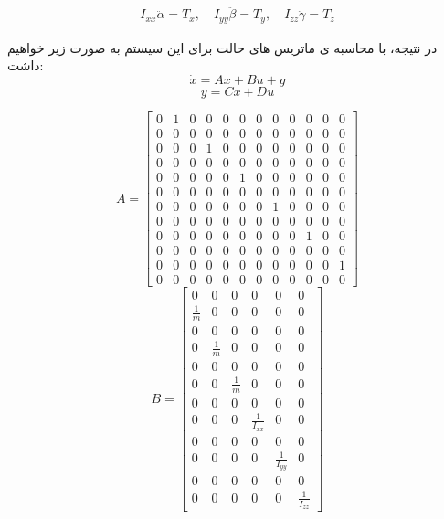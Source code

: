 \begin{align}
	I_{xx} \ddot{\alpha} = T_x, \quad I_{yy} \ddot{\beta} = T_y, \quad I_{zz} \ddot{\gamma} = T_z
	\label{eq:method-rotational-eom}
\end{align}


در نتیجه، با محاسبه ی ماتریس های حالت برای این سیستم به صورت زیر خواهیم داشت:
\begin{equation}
	\dot{x} = A x + B u + g
	\label{eq:method-state-dynamics}
\end{equation}
\begin{equation}
	y = C x + D u
	\label{eq:method-output}
\end{equation}

\begin{equation}
	A =
	\begin{bmatrix}
		0 & 1 & 0 & 0 & 0 & 0 & 0 & 0 & 0 & 0 & 0 & 0 \\
		0 & 0 & 0 & 0 & 0 & 0 & 0 & 0 & 0 & 0 & 0 & 0 \\
		0 & 0 & 0 & 1 & 0 & 0 & 0 & 0 & 0 & 0 & 0 & 0 \\
		0 & 0 & 0 & 0 & 0 & 0 & 0 & 0 & 0 & 0 & 0 & 0 \\
		0 & 0 & 0 & 0 & 0 & 1 & 0 & 0 & 0 & 0 & 0 & 0 \\
		0 & 0 & 0 & 0 & 0 & 0 & 0 & 0 & 0 & 0 & 0 & 0 \\
		0 & 0 & 0 & 0 & 0 & 0 & 0 & 1 & 0 & 0 & 0 & 0 \\
		0 & 0 & 0 & 0 & 0 & 0 & 0 & 0 & 0 & 0 & 0 & 0 \\
		0 & 0 & 0 & 0 & 0 & 0 & 0 & 0 & 0 & 1 & 0 & 0 \\
		0 & 0 & 0 & 0 & 0 & 0 & 0 & 0 & 0 & 0 & 0 & 0 \\
		0 & 0 & 0 & 0 & 0 & 0 & 0 & 0 & 0 & 0 & 0 & 1 \\
		0 & 0 & 0 & 0 & 0 & 0 & 0 & 0 & 0 & 0 & 0 & 0
	\end{bmatrix}
	\label{eq:method-A-matrix}
\end{equation}
\begin{equation}
	B =
	\begin{bmatrix}
		0 & 0 & 0 & 0 & 0 & 0 \\
		\frac{1}{m} & 0 & 0 & 0 & 0 & 0 \\
		0 & 0 & 0 & 0 & 0 & 0 \\
		0 & \frac{1}{m} & 0 & 0 & 0 & 0 \\
		0 & 0 & 0 & 0 & 0 & 0 \\
		0 & 0 & \frac{1}{m} & 0 & 0 & 0 \\
		0 & 0 & 0 & 0 & 0 & 0 \\
		0 & 0 & 0 & \frac{1}{I_{xx}} & 0 & 0 \\
		0 & 0 & 0 & 0 & 0 & 0 \\
		0 & 0 & 0 & 0 & \frac{1}{I_{yy}} & 0 \\
		0 & 0 & 0 & 0 & 0 & 0 \\
		0 & 0 & 0 & 0 & 0 & \frac{1}{I_{zz}}
	\end{bmatrix}
	\label{eq:method-B-matrix}
\end{equation}
